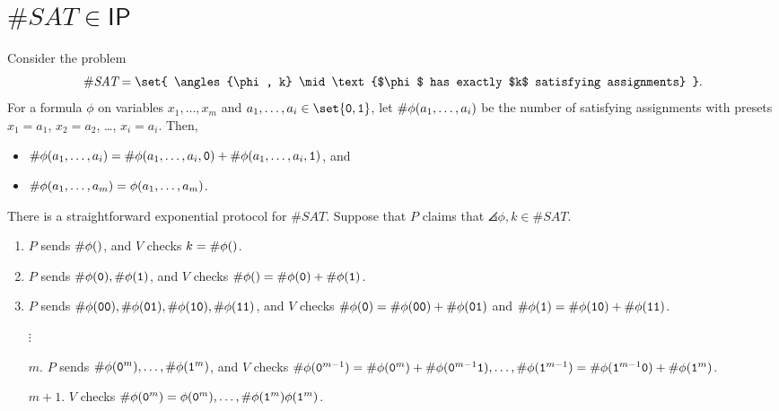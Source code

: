 \documentclass{standalone}
\begin{document}
\section{\texorpdfstring{\(\texttt\#\textit{SAT} \in \mathsf{IP}\)}{\#SAT in IP}}
Consider the problem
\[
  \textsf\#\textit{SAT} = \set{
    \angles{\phi, k} \mid \text{$\phi$ has exactly $k$ satisfying assignments}
  }.
\]
For a formula \(\phi\) on variables \(x_1, \dots, x_m\) and
\(a_1, \dots, a_i \in \set{\mathtt 0, \mathtt 1}\),
let \(\textsf\#\phi(a_1, \dots, a_i)\) be the number of satisfying assignments
with presets \(x_1 = a_1\), \(x_2 = a_2\), \ldots, \(x_i = a_i\).
Then,
\begin{itemize}
  \item \(\textsf\#\phi(a_1, \dots, a_i) = \textsf\#\phi(a_1, \dots, a_i, \mathtt 0) +
                                     \textsf\#\phi(a_1, \dots, a_i, \mathtt 1)\), and
  \item \(\textsf\#\phi(a_1, \dots, a_m) = \phi(a_1, \dots, a_m)\).
\end{itemize}

There is a straightforward exponential protocol for \(\texttt\#\textit{SAT}\).
Suppose that \(P\) claims that \(\angles{\phi, k} \in \texttt\#\textit{SAT}\).
\begin{enumerate}[start=0]
  \item \(P\) sends \(\textsf\#\phi()\), and \(V\) checks \(k = \textsf\#\phi()\).
  \item \(P\) sends \(\textsf\#\phi(\mathtt 0), \textsf\#\phi(\mathtt 1)\),
    and \(V\) checks \(\textsf\#\phi() = \textsf\#\phi(\mathtt 0) + \textsf\#\phi(\mathtt 1)\).
  \item \(P\) sends \(\textsf\#\phi(\mathtt{00}),
                      \textsf\#\phi(\mathtt{01}),
                      \textsf\#\phi(\mathtt{10}),
                      \textsf\#\phi(\mathtt{11})\),
    and \(V\) checks \(\textsf\#\phi(\mathtt 0) = \textsf\#\phi(\mathtt{00}) +
                                            \textsf\#\phi(\mathtt{01})\)
                 and \(\textsf\#\phi(\mathtt 1) = \textsf\#\phi(\mathtt{10}) +
                                            \textsf\#\phi(\mathtt{11})\).
  \item[\(\vdots\)]
  \item[\(m\).] \(P\) sends \(\textsf\#\phi(\mathtt{0}^m), \dots,
                              \textsf\#\phi(\mathtt 1^m)\), and \(V\) checks
    \(\textsf\#\phi(\mathtt 0^{m - 1}) = \textsf\#\phi(\mathtt 0^m) +
                                   \textsf\#\phi(\mathtt 0^{m - 1} \mathtt 1), \dots,
      \textsf\#\phi(\mathtt 1^{m - 1}) = \textsf\#\phi(\mathtt 1^{m - 1} \mathtt 0) +
                                   \textsf\#\phi(\mathtt 1^m)\).
  \item[\(m + 1\).] \(V\) checks \(\textsf\#\phi(\mathtt 0^m) = \phi(\mathtt 0^m),
                            \dots, \textsf\#\phi(\mathtt 1^m) \phi(\mathtt 1^m)\).
\end{enumerate}
\end{document}
